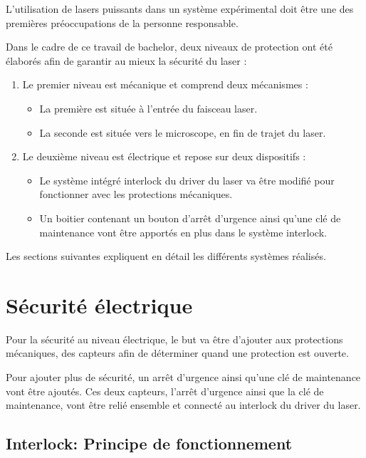 L'utilisation de lasers puissants dans un système expérimental doit être une des premières préoccupations de la personne responsable.

Dans le cadre de ce travail de bachelor, deux niveaux de protection ont été élaborés afin de garantir au mieux la sécurité du laser :

\begin{enumerate}
    \item Le premier niveau est mécanique et comprend deux mécanismes :
          \begin{itemize}
              \item La première est située à l'entrée du faisceau laser.
              \item La seconde est située vers le microscope, en fin de trajet du laser.
          \end{itemize}
    \item Le deuxième niveau est électrique et repose sur deux dispositifs :
          \begin{itemize}
              \item Le système intégré interlock du driver du laser va être modifié pour fonctionner avec les protections mécaniques.
              \item Un boitier contenant un bouton d'arrêt d'urgence ainsi qu'une clé de maintenance vont être apportés en plus dans le système interlock.
          \end{itemize}
\end{enumerate}

Les sections suivantes expliquent en détail les différents systèmes réalisés.

\section{Sécurité électrique}

Pour la sécurité au niveau électrique, le but va être d'ajouter aux protections mécaniques, des capteurs afin de déterminer quand une protection est ouverte.

Pour ajouter plus de sécurité, un arrêt d'urgence ainsi qu'une clé de maintenance vont être ajoutés. Ces deux capteurs, l'arrêt d'urgence ainsi que la clé de maintenance, vont être relié ensemble et connecté au interlock du driver du laser.

\newpage
\subsection{Interlock: Principe de fonctionnement}

